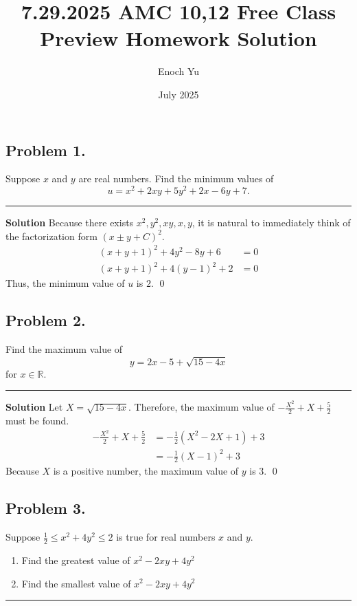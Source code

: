 \documentclass{article}
\title{7.29.2025 AMC 10,12 Free Class Preview Homework Solution}
\author{Enoch Yu}
\date{July 2025}
\newenvironment{solution}{\begin{trivlist}\item[]{\bf Solution}}{\qed \end{trivlist}}
\newcommand{\MyLine}{\noindent\rule{0.99\textwidth}{0.4pt}}
\begin{document}
\maketitle

\subsection*{Problem 1.}
{\color {Gray}
Suppose $x$ and $y$ are real numbers. Find the minimum values of
\[
u = x^2 + 2xy + 5y^2 + 2x - 6y + 7.
\]
}
\MyLine
\begin{solution}
Because there exists $x^2, y^2, xy, x, y$, it is natural
to immediately think of the factorization form $(x \pm y + C)^2$.
\begin{align*}
    (x + y + 1)^2 + 4y^2 - 8y + 6 &= 0 \\
    (x + y + 1)^2 + 4(y - 1)^2 + 2 &= 0
\end{align*}
Thus, the minimum value of $u$ is $\boxed{2}$.
\end{solution}

\subsection*{Problem 2.}
{\color {Gray}
Find the maximum value of
\[
y = 2x - 5 + \sqrt{15 - 4x}
\]
for $x \in \mathbb{R}$.
}

\MyLine
\begin{solution}
Let $X = \sqrt{15 - 4x}$. Therefore, the maximum value
of $-\frac{X^2}{2} + X + \frac{5}{2}$ must be found.
\begin{align*}
    -\frac{X^2}{2} + X + \frac{5}{2}
    &= -\frac{1}{2} \left( X^2 -2X + 1 \right) + 3 \\
    &= -\frac{1}{2} \left( X - 1 \right)^2 + 3
\end{align*}
Because $X$ is a positive number, the maximum value of
$y$ is $\boxed{3}$.
\end{solution}

\subsection*{Problem 3.}
{\color {Gray}
Suppose $\frac{1}{2} \leq x^2 + 4y^2 \leq 2$ is true for
real numbers $x$ and $y$.
\begin{enumerate}
    \item Find the greatest value of $x^2 - 2xy + 4y^2$
    \item Find the smallest value of $x^2 - 2xy + 4y^2$
\end{enumerate}
}
\MyLine
\end{document}
